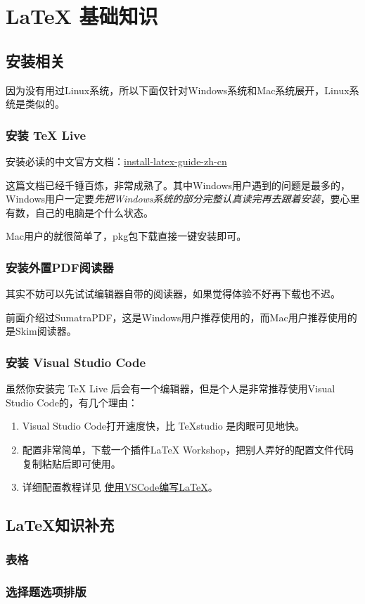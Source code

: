 \section{ \LaTeX{} 基础知识}

\subsection{安装相关}
因为没有用过Linux系统，所以下面仅针对Windows系统和Mac系统展开，Linux系统是类似的。


\subsubsection{ 安装 \TeX{} Live }
安装必读的中文官方文档：\href{https://gitee.com/OsbertWang/install-latex-guide-zh-cn/releases}{install-latex-guide-zh-cn}

这篇文档已经千锤百炼，非常成熟了。其中Windows用户遇到的问题是最多的，Windows用户一定要\emph{先把Windows系统的部分完整认真读完再去跟着安装}，要心里有数，自己的电脑是个什么状态。

Mac用户的就很简单了，pkg包下载直接一键安装即可。


\subsubsection{ 安装外置PDF阅读器 }

其实不妨可以先试试编辑器自带的阅读器，如果觉得体验不好再下载也不迟。

前面介绍过SumatraPDF，这是Windows用户推荐使用的，而Mac用户推荐使用的是Skim阅读器。

\subsubsection{ 安装 Visual Studio Code }

虽然你安装完 \TeX{} Live 后会有一个编辑器，但是个人是非常推荐使用Visual Studio Code的，有几个理由：

\begin{enumerate}
  \item Visual Studio Code打开速度快，比 \TeX{}studio 是肉眼可见地快。
  \item 配置非常简单，下载一个插件LaTeX Workshop，把别人弄好的配置文件代码复制粘贴后即可使用。
  \item 详细配置教程详见 \href{https://zhuanlan.zhihu.com/p/38178015?utm_source=qq&utm_medium=social&utm_oi=1122597840500740096}{使用VSCode编写LaTeX}。
\end{enumerate}



\subsection{\LaTeX{}知识补充}

\subsubsection{表格}

\subsubsection{选择题选项排版}
